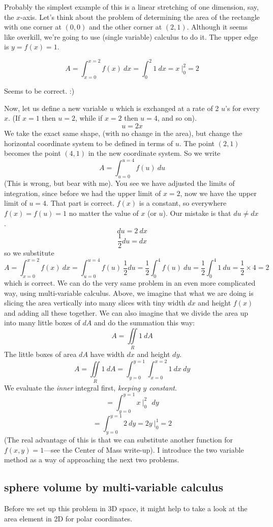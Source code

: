 \documentclass[11pt, oneside]{report}   	%
\begin{document}
Probably the simplest example of this is a linear stretching of one dimension, say, the $x$-axis.  Let's think about the problem of determining the area of the rectangle with one corner at $(0,0)$ and the other corner at $(2,1)$.  Although it seems like overkill, we're going to use (single variable) calculus to do it.  The upper edge is $y = f(x) = 1$.

\[ A = \int_{x=0}^{x=2} f(x)\ dx = \int_0^2 1\ dx = x  \ \bigg |_{0}^{2} = 2 \]

Seems to be correct.  :)

Now, let us define a new variable $u$ which is exchanged at a rate of 2 $u$'s for every $x$.  (If $x=1$ then $u=2$, while if $x=2$ then $u=4$, and so on).
\[ u = 2x \]
We take the exact same shape, (with no change in the area), but change the horizontal coordinate system to be defined in terms of $u$.  The point $(2,1)$ becomes the point $(4,1)$ in the new coordinate system.  So we write
\[ A = \int_{u=0}^{u=4} f(u)\ du  \]
(This is wrong, but bear with me).  You see we have adjusted the limits of integration, since before we had the upper limit of $x=2$, now we have the upper limit of $u=4$.  That part is correct.  $f(x)$ is a constant, so everywhere $f(x) = f(u) = 1$ no matter the value of $x$ (or $u$).  Our mistake is that $du \neq dx$.
\[ du = 2\ dx \]
\[ \frac{1}{2} du = dx \]
so we substitute
\[ A = \int_{x=0}^{x=2} f(x)\ dx =  \int_{u=0}^{u=4} f(u)\ \frac{1}{2}du =  \frac{1}{2} \int_0^4 f(u)\ du = \frac{1}{2} \int_0^4 1\ du =  \frac{1}{2} \times 4 = 2 \]
which is correct.
We can do the very same problem in an even more complicated way, using multi-variable calculus.  Above, we imagine that what we are doing is slicing the area vertically into many slices with tiny width $dx$ and height $f(x)$ and adding all these together.  We can also imagine that we divide the area up into many little boxes of $dA$ and do the summation this way:
\[ A = \iint\limits_{R} 1 \ dA \]
The little boxes of area $dA$ have width $dx$ and height $dy$.
\[ A = \iint\limits_{R} 1 \ dA =   \int_{y=0}^{y=1} \int_{x=0}^{x=2} 1 \ dx \ dy  \]
We evaluate the \emph{inner} integral first, \emph{keeping $y$ constant}.
\[ = \int_{y=0}^{y=1}  x  \ \bigg |_{0}^{2} \ \ \ dy  \]
\[ = \int_{y=0}^{y=1}  2 \ dy  = 2y   \ \bigg |_{0}^{1} = 2  \]
(The real advantage of this is that we can substitute another function for $f(x,y) = 1$---see the Center of Mass write-up).  I introduce the two variable method as a way of approaching the next two problems.

\subsection*{sphere volume by multi-variable calculus}
Before we set up this problem in 3D space, it might help to take a look at the area element in 2D for polar coordinates.
\end{document}
